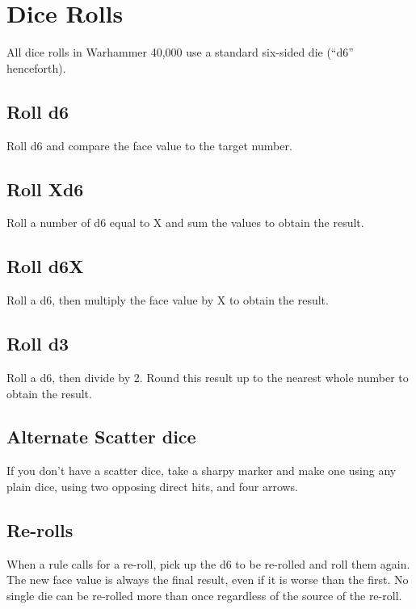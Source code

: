 \section{Dice Rolls}
All dice rolls in Warhammer 40,000 use a standard six-sided die
(“d6” henceforth).

\subsection{Roll d6}
Roll d6 and compare the face value to the target number.

\subsection{Roll Xd6}
Roll a number of d6 equal to X and sum the values to obtain the
result.

\subsection{Roll d6X}
Roll a d6, then multiply the face value by X to obtain the result.


\subsection{Roll d3}
Roll a d6, then divide by 2. Round this result up to the nearest
whole number to obtain the result.


\subsection{Alternate Scatter dice}
If you don't have a scatter dice, take a sharpy marker and make one using any plain dice, using two opposing direct hits, and four arrows.

\subsection{Re-rolls}
When a rule calls for a re-roll, pick up the d6 to be re-rolled and
roll them again. The new face value is always the final result, even
if it is worse than the first. No single die can be re-rolled more than
once regardless of the source of the re-roll.



